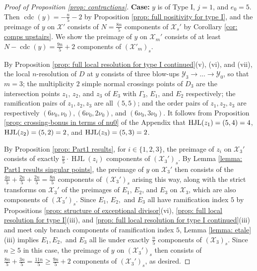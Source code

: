 \documentclass[12pt]{amsart}
\numberwithin{equation}{section}
\theoremstyle{definition}
\newcommand{\X}{\mathcal{X}}
\newcommand{\Y}{\mathcal{Y}}
\newcommand{\tx}[1]{\text{#1}}
\let\L\relax
\DeclareMathOperator{\cdc}{cdc}
\DeclareMathOperator{\HJL}{HJL}
\DeclareMathOperator{\L}{L}
\begin{document}
\begin{proof}[Proof of Proposition \ref{prop: contractions}]
    \textbf{Case:} $y$ is of Type I, $j=1$, and $e_0=5$. Then $\cdc(y)=-\frac{n}{5}-2$ by Proposition \ref{prop: full positivity for type I}, and the preimage of $y$ on $\X'$ consists of $N=\frac{8n}{5}$ components of $\X_s'$ by Corollary \ref{cor: comps upstairs}. We show the preimage of $y$ on $\X_m'$ consists of at least $N-\cdc(y)=\frac{9n}{5}+2$ components of $(\X'_m)_s$.

    By Proposition \ref{prop: full local resolution for type I continued}(v), (vi), and (vii), the local $n$-resolution of $D$ at $y$ consists of three blow-ups $\Y_3\to...\to\Y_0$, so that $m=3$; the multiplicity $2$ simple normal crossings points of $D_3$ are the intersection points $z_1$, $z_2$, and $z_3$ of $E_3$ with $\Gamma_3$, $E_1$, and $E_2$ respectively; the ramification pairs of $z_1,z_2,z_3$ are all $(5,5)$; and the order pairs of $z_1,z_2,z_3$ are respectively $(6\nu_0,\nu_0),(6\nu_0,2\nu_0)$, and $(6\nu_0,3\nu_0)$. It follows from Proposition \ref{prop: crossing-bonus in terms of nu0} of the Appendix that $\HJL(z_1)=\L(5,4)=4$, $\HJL(z_2)=\L(5,2)=2$, and $\HJL(z_3)=\L(5,3)=2$.

    By Proposition \ref{prop: Part1 results}, for $i\in\{1,2,3\}$, the preimage of $z_i$ on $\X_3'$ consists of exactly $\frac{n}{5}\cdot\HJL(z_i)$ components of $(\X_3')_s$. %
    By Lemma \ref{lemma: Part1 results singular points}, the preimage of $y$ on $\X_3'$ then consists of the $\frac{4n}{5}+\frac{2n}{5}+\frac{2n}{5}=\frac{8n}{5}$ components of $(\X_3')_s$ arising this way, along with the strict transforms on $\X_3'$ of the preimages of $E_1$, $E_2$, and $E_3$ on $\X_3$, which are also components of $(\X_3')_s$. Since $E_1$, $E_2,$ and $E_3$ all have ramification index $5$ by Propositions \ref{prop: structure of exceptional divisor}(vi), \ref{prop: full local resolution for type I}(iii), and \ref{prop: full local resolution for type I continued}(iii) and meet only branch components of ramification index $5$,
    Lemma \ref{lemma: etale}(iii) implies $E_1,E_2,$ and $E_3$ all lie under exactly $\frac{n}{5}$ components of $(\X_3)_s$. Since $n\geq 5$ in this case, the preimage of $y$ on $(\X_3')_s$ then consists of $\frac{8n}{5}+\frac{3n}{5}=\frac{11n}{5}\geq \frac{9n}{5}+2$ components of $(\X_3')_s$, as desired.



\end{proof}
\end{document}
